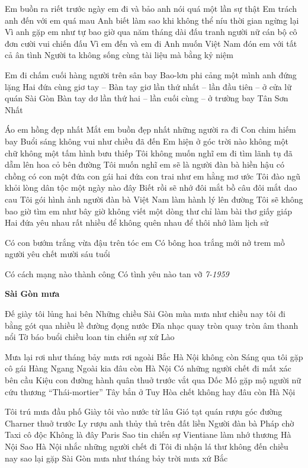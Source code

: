 \documentclass[../main.tex]{subfiles}
\begin{document}
\begin{multicols}{2}
Em buồn ra riết trước ngày em đi 
và bảo anh nói quá một lần sự thật 
Em trách anh đến với em quá mau 
Anh biết làm sao 
khi không thể níu thời gian ngừng lại 
Vì anh gặp em như tự bao giờ 
qua năm tháng dài đấu tranh  
người nữ cán bộ cô đơn cười vui chiến đấu 
Vì em đến và em đi 
Anh muốn Việt Nam đón em với tất cả ân tình 
Người ta không sống cùng tài liệu mà bằng kỷ niệm 
 
Em đi chấm cuối hàng người trên sân bay 
Bao-lơn phi cảng một mình anh đứng lặng 
Hai đứa cùng giơ tay – 
Bàn tay giơ lần thứ nhất – lần đầu tiên – ở cửa lữ quán Sài Gòn 
Bàn tay dơ lần thứ hai – lần cuối cùng – ở trường bay Tân Sơn Nhất 
 
Áo em hồng đẹp nhất 
Mắt em buồn đẹp nhất những người ra đi 
Con chim hiếm bay 
Buổi sáng không vui như chiều đã đến 
Em hiện ở góc trời nào 
không một chữ 
không một tấm hình bưu thiếp 
Tôi không muốn nghĩ 
em đi tìm lãnh tụ đã dẵm lên hoa cỏ bên đường 
Tôi muốn nghĩ  
em sẽ là người đàn bà hiền hậu 
có chồng có con 
một đứa con gái hai đứa con trai 
như em hằng mơ ước 
Tôi đào ngũ khỏi lòng dân tộc một ngày nào đây 
Biết rồi sẽ nhớ đôi mắt bồ câu 
đôi mắt dao cau 
Tôi gói hình ảnh người đàn bà Việt Nam làm hành lý lên đường 
Tôi sẽ không bao giờ tìm em 
như bây giờ không viết một dòng thư 
chỉ làm bài thơ giấy giáp 
Hai đứa yêu nhau rất nhiều để không quên nhau 
để thôi nhớ làm lịch sử  
 
Có con bướm trắng vừa đậu trên tóc em 
Có bông hoa trắng mới nở trem mồ người yêu chết mười sáu tuổi 
 
Có cách mạng nào thành công 
Có tình yêu nào tan vỡ 
\textit{7-1959} 
 
 
\textbf{Sài Gòn mưa} 
 
Đế giày tôi lủng hai bên 
Những chiều Sài Gòn mùa mưa như chiều nay 
tôi đi bằng gót qua nhiều lề đường đọng nước 
Đĩa nhạc quay tròn quay tròn 
âm thanh nổi 
Tờ báo buổi chiều loan tin chiến sự xứ Lào 
 
Mưa lại rơi 
như tháng bảy mưa rơi ngoài Bắc 
Hà Nội không còn 
Sáng qua tôi gặp cô gái Hàng Ngang 
Ngoài kia đâu còn Hà Nội 
Có những người chết đi 
mất xác bên cầu Kiệu  
con đường hành quân thuở trước vắt qua Dốc Mỏ 
gặp mộ người nữ cứu thương 
“Thái-mortier” Tây bắn ở Tuy Hòa chết không hay đâu còn Hà Nội 
 
Tôi trú mưa đầu phố 
Giày tôi vào nước từ lâu 
Gió tạt quán rượu góc đường Charner thuở trước 
Ly rượu anh thủy thủ trên đất liền 
Người đàn bà Pháp chờ Taxi cô độc 
Không là đây Paris 
Sao tin chiến sự Vientiane làm nhớ thương Hà Nội 
Sao Hà Nội nhắc những người chết đi 
Tôi đi nhận lá thư không đến chiều nay 
sao lại gặp Sài Gòn mưa như tháng bảy trời mưa xứ Bắc 
 

\end{multicols}
\end{document}

